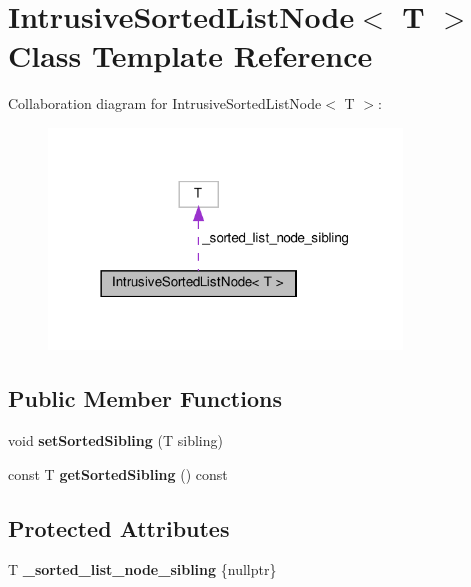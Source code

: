 \hypertarget{classIntrusiveSortedListNode}{}\section{Intrusive\+Sorted\+List\+Node$<$ T $>$ Class Template Reference}
\label{classIntrusiveSortedListNode}


Collaboration diagram for Intrusive\+Sorted\+List\+Node$<$ T $>$\+:\nopagebreak
\begin{figure}[H]
\begin{center}
\leavevmode
\includegraphics[width=266pt]{d3/d3d/classIntrusiveSortedListNode__coll__graph}
\end{center}
\end{figure}
\subsection*{Public Member Functions}
\begin{DoxyCompactItemize}
\item 
\mbox{\label{classIntrusiveSortedListNode_a4f4891e6b0500ad8b81fdb6603b12d4e}} 
void {\bfseries set\+Sorted\+Sibling} (T sibling)
\item 
\mbox{\label{classIntrusiveSortedListNode_ac5fb1a2ec5470b5ca2f2ee13c5f391cb}} 
const T {\bfseries get\+Sorted\+Sibling} () const
\end{DoxyCompactItemize}
\subsection*{Protected Attributes}
\begin{DoxyCompactItemize}
\item 
\mbox{\label{classIntrusiveSortedListNode_a0c80217609ef040929472c44d81e5cd1}} 
T {\bfseries \+\_\+sorted\+\_\+list\+\_\+node\+\_\+sibling} \{nullptr\}
\end{DoxyCompactItemize}


